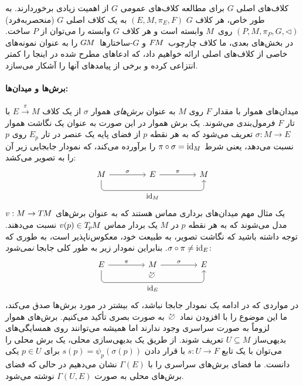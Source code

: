 کلاف‌های اصلی $G$ برای مطالعه کلاف‌های عمومی $G$ از اهمیت زیادی برخوردارند.
به طور خاص، هر کلاف $G$ $(E,M,\pi_E,F)$ به یک کلاف اصلی $G$ (منحصربه‌فرد) $(P,M,\pi_P,G,\lhd)$ روی~$M$ وابسته است و هر کلاف $G$ وابسته را می‌توان از $P$ ساخت.
در بخش‌های بعدی، ما کلاف چارچوب~$F\mkern-1.5muM$ و $G$-ساختارها~$G\mkern-1.4muM$ را به عنوان نمونه‌های خاصی از کلاف‌های اصلی ارائه خواهیم داد، که ادعاهای مطرح شده در اینجا را کمتر انتزاعی کرده و برخی از پیامدهای آنها را آشکار می‌سازد.

\paragraph{برش‌ها و میدان‌ها:}
میدان‌های هموار با مقدار $F$ روی $M$ به عنوان \emph{برش‌های} هموار $\sigma$ از یک کلاف $E\!\xrightarrow{\pi}\!M$ با تار $F$ فرمول‌بندی می‌شوند.
یک برش هموار در این صورت به عنوان یک نگاشت هموار $\sigma:M\to E$ تعریف می‌شود که به هر نقطه $p$ از فضای پایه یک عنصر در تار $E_p$ روی $p$ نسبت می‌دهد، یعنی شرط $\pi\circ\sigma=\mathrm{id}_M$ را برآورده می‌کند، که نمودار جابجایی زیر آن را به تصویر می‌کشد:
\begin{equation}\label{cd:section_proj_idM}
\begin{tikzcd}[row sep=3em, column sep=4.5em]
	  M \arrow[r, "\sigma"]
		\arrow[rr, rounded corners, to path={ 
				-- ([yshift=-3.ex]\tikztostart.south) 
				--node[below, pos=.5]{\small$\id_M$} ([yshift=-3.ex]\tikztotarget.south) 
				-- (\tikztotarget.south)
				}]
	& E \arrow[r, "\pi"]
	& M
\end{tikzcd}
\end{equation}
یک مثال مهم میدان‌های برداری مماس هستند که به عنوان برش‌های $v: M\to T\mkern-1.5muM$ مدل می‌شوند که به هر نقطه $p$ در $M$ یک بردار مماس $v(p)\in T_{\mkern-1.5mu p}\mkern-.5muM$ نسبت می‌دهند.
توجه داشته باشید که نگاشت تصویر، به طبیعت خود، معکوس‌ناپذیر است، به طوری که $\sigma\circ\pi\neq\mathrm{id}_E$.
بنابراین نمودار زیر به طور کلی جابجا \emph{نمی‌شود}:
\begin{equation}\label{cd:section_proj_noncommutative}
\begin{tikzcd}[row sep=3em, column sep=4.5em,
			   execute at end picture={
					\node [] at (-.04, -.46) {$\noncommutative$};
					}]
	  E \arrow[r, "\pi"]
		\arrow[rr, rounded corners, to path={ 
				-- ([yshift=-3.5ex]\tikztostart.south) 
				--node[below, pos=.5]{\small$\id_E$} ([yshift=-3.5ex]\tikztotarget.south) 
				-- (\tikztotarget.south)
				}]
	& M \arrow[r, "\sigma"]
	& E
\end{tikzcd}
\end{equation}
در مواردی که در ادامه یک نمودار جابجا نباشد، که بیشتر در مورد برش‌ها صدق می‌کند، ما این موضوع را با افزودن نماد $\raisebox{-2pt}{\noncommutative}$ به صورت بصری تأکید می‌کنیم.
برش‌های هموار لزوماً به صورت سراسری وجود ندارند اما همیشه می‌توانند روی همسایگی‌های بدیهی‌ساز $U\subseteq M$ تعریف شوند.
از طریق یک بدیهی‌سازی محلی، یک برش محلی را می‌توان با یک تابع $s:U\to F$ با قرار دادن $s(p) = \psi_p(\sigma(p))$ برای $p\in U$ یکی دانست.
ما فضای برش‌های سراسری را با $\Gamma(E)$ نشان می‌دهیم در حالی که فضای برش‌های محلی به صورت $\Gamma(U,E)$ نوشته می‌شود.

